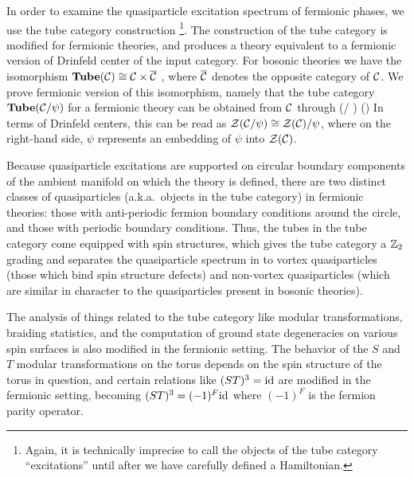 In order to examine the quasiparticle excitation spectrum of fermionic phases, 
we use the tube category construction \cite{ocneanu1994}\footnote{Again, it is technically imprecise to call the objects 
of the tube category ``excitations'' until after we have carefully defined a Hamiltonian.}.
The construction of the tube category is modified for fermionic theories, and produces a theory
equivalent to a fermionic version of Drinfeld center of the input category.
For bosonic theories we have the isomorphism $\textbf{Tube}(\mathcal{C})\cong\mathcal{C}\times\overline{\mathcal{C}}$ \cite{muger2003b}, where $\overline{\mathcal{C}}$ denotes the opposite category of $\mathcal{C}$. 
We prove fermionic version of this isomorphism, namely 
that the tube category $\textbf{Tube}(\mathcal{C}/\psi)$ for a fermionic theory can be obtained from $\mathcal{C}$ through
\be 
	\tube(\mcc / \psi) \cong \mcc \times (\overline{\mcc / \psi})
\ee
In terms of Drinfeld centers, this can be read as $\mathcal{Z}(\mathcal{C} / \psi)\cong \mathcal{Z}(\mathcal{C})/\psi$, where on the right-hand side, 
$\psi$ represents an embedding of $\psi$ into $\mathcal{Z}(\mathcal{C})$.


Because quasiparticle excitations are supported on circular boundary components of the ambient 
manifold on which the theory is defined, there are two distinct classes of quasiparticles (a.k.a.\ objects in the tube category) in 
fermionic theories: those with anti-periodic fermion boundary conditions around the circle, and 
those with periodic boundary conditions. 
Thus, the tubes in the tube category come equipped with spin structures, which gives the tube category a $\mathbb{Z}_2$ grading
and separates the quasiparticle spectrum in to vortex quasiparticles (those which bind spin structure defects) 
and non-vortex quasiparticles (which are similar in character to the quasiparticles present in bosonic theories). 






The analysis of things related to the tube category like modular transformations, braiding statistics, and the computation of ground state degeneracies on various spin surfaces
is also modified in the fermionic setting.  
The behavior of the $S$ and $T$ modular transformations on the torus depends on the spin structure of the torus in question, and 
certain relations like $(ST)^3 = \text{id}$ are modified in the fermionic setting, becoming 
$(ST)^3=(-1)^F\text{id}$ where $(-1)^F$ is the fermion parity operator.

